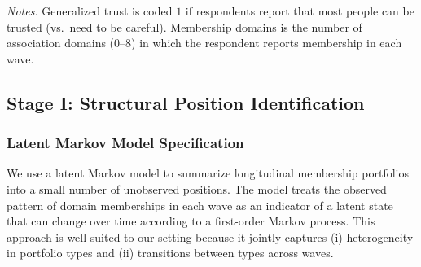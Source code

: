 \begin{table}[!htbp]
\centering
\caption{Summary Statistics}
\label{table:summary_stats}
\vspace{0.25em}
\begin{flushleft}
\footnotesize \emph{Notes.} Generalized trust is coded $1$ if respondents report that most people can be trusted (vs.\ need to be careful). Membership domains is the number of association domains (0--8) in which the respondent reports membership in each wave.
\end{flushleft}
\end{table}



\subsection{Stage I: Structural Position Identification}

\subsubsection{Latent Markov Model Specification}

We use a latent Markov model to summarize longitudinal membership portfolios into a small number of unobserved positions. The model treats the observed pattern of domain memberships in each wave as an indicator of a latent state that can change over time according to a first-order Markov process. This approach is well suited to our setting because it jointly captures (i) heterogeneity in portfolio types and (ii) transitions between types across waves.

